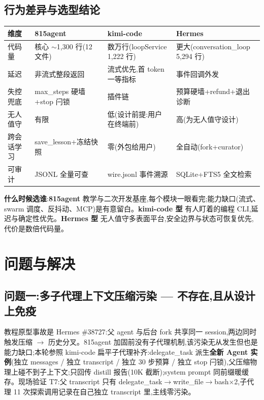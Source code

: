 \documentclass[10pt,a4paper]{article}
\renewcommand{\small}{\fontsize{8}{11.5}\selectfont}
\begin{document}
\subsection{行为差异与选型结论}
{\small
\begin{longtable}{|L{0.14\textwidth}|L{0.26\textwidth}|L{0.26\textwidth}|L{0.24\textwidth}|}
\hline
{}\textbf{维度} & \textbf{815agent} & \textbf{kimi-code} & \textbf{Hermes}\\\hline\endhead
代码量 & 核心 $\sim$1,300 行(12 文件) & 数万行(loopService 1,222 行) & 更大(conversation\_loop 5,294 行)\\\hline
延迟 & 非流式整段返回 & 流式优先,首 token 一等指标 & 事件回调外发\\\hline
失控兜底 & max\_steps 硬墙+stop 闩锁 & 插件链 & 预算硬墙+refund+退出诊断\\\hline
无人值守 & 有限 & 低(设计前提:用户在终端前) & 高(为无人值守设计)\\\hline
跨会话学习 & save\_lesson+冻结快照 & 零(外包给用户) & 全自动(fork+curator)\\\hline
可审计 & JSONL 全量可查 & wire.jsonl 事件溯源 & SQLite+FTS5 全文检索\\\hline
\end{longtable}}

\textbf{什么时候选谁}:\textbf{815agent} 教学与二次开发基座,每个模块一眼看完;能力缺口(流式、swarm 调度、反抖动、MCP)是有意留白。\textbf{kimi-code 型} 有人盯着的编程 CLI,延迟与确定性优先。\textbf{Hermes 型} 无人值守多表面平台,安全边界与状态可恢复优先,代价是数倍代码量。

\section{问题与解决}

\subsection{问题一:多子代理上下文压缩污染 --- 不存在,且从设计上免疫}
教程原型事故是 Hermes \#38727:父 agent 与后台 fork 共享同一 session,两边同时触发压缩 $\to$ 历史分叉。815agent 加固前没有子代理机制,该污染无从发生但也是能力缺口;本轮参照 kimi-code 扁平子代理补齐:delegate\_task 派生\textbf{全新 Agent 实例}(独立 messages / 独立 transcript / 独立 30 步预算 / 独立 stop 闩锁),父压缩物理上碰不到子上下文;只回传 distill 报告(10K 截断);system prompt 同前缀暖缓存。现场验证 T7:父 transcript 只有 delegate\_task$\to$write\_file$\to$bash$\times$2,子代理 11 次探索调用记录在自己独立 transcript 里,主线零污染。
\end{document}
